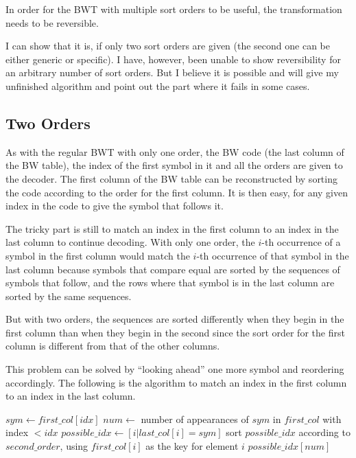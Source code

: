 \documentclass[a4paper]{scrreprt}
\begin{document}
In order for the BWT with multiple sort orders to be useful, the transformation
needs to be reversible.

I can show that it is, if only two sort orders are given (the second one can be
either generic or specific). I have, however, been unable to show reversibility
for an arbitrary number of sort orders. But I believe it is possible and will
give my unfinished algorithm and point out the part where it fails in some cases.

\subsection{Two Orders}

As with the regular BWT with only one order, the BW code (the last column of
the BW table), the index of the first symbol in it and all the orders are given
to the decoder. The first column of the BW table can be reconstructed by sorting
the code according to the order for the first column. It is then easy, for any
given index in the code to give the symbol that follows it.

The tricky part is still to match an index in the first column to an index in
the last column to continue decoding. With only one order, the \(i\)-th
occurrence of a symbol in the first column would match the \(i\)-th occurrence
of that symbol in the last column because symbols that compare equal are sorted
by the sequences of symbols that follow, and the rows where that symbol is in
the last column are sorted by the same sequences.

But with two orders, the sequences are sorted differently when they begin in the
first column than when they begin in the second since the sort order for the
first column is different from that of the other columns.

This problem can be solved by ``looking ahead'' one more symbol and reordering
accordingly. The following is the algorithm to match an index in the first
column to an index in the last column.

\begin{algorithm}
\begin{algorithmic}[1]
\State $sym \gets first\_col[idx]$
\State $num \gets$ number of appearances of $sym$ in $first\_col$ with index $<
idx$
\State $possible\_idx \gets [i | last\_col[i] = sym]$
\State sort $possible\_idx$ according to $second\_order$, using $first\_col[i]$
as the key for element $i$
\State \Return $possible\_idx[num]$
\EndProcedure
\end{algorithmic}
\end{algorithm}
\end{document}

